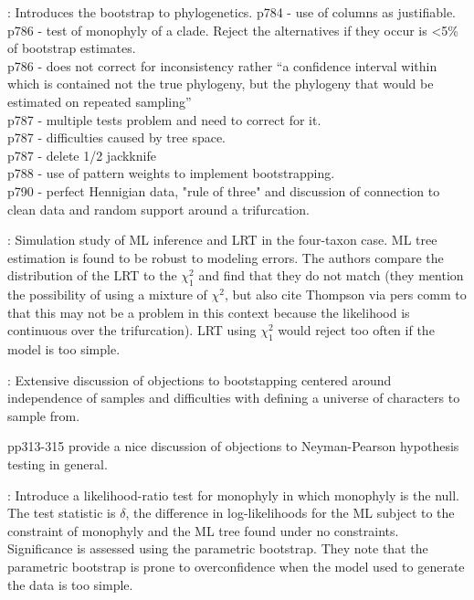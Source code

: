 \documentclass[11pt]{article}
\begin{document}
\citet{Felsenstein1985}: Introduces the bootstrap to phylogenetics.
p784 - use of columns as justifiable.\\
p786 - test of monophyly of a clade.  Reject the alternatives if they occur is <5\% of bootstrap estimates.\\
p786 - does not correct for inconsistency rather ``a confidence interval within which is contained not the true phylogeny, but the phylogeny that would be estimated on repeated sampling''\\
p787 - multiple tests problem and need to correct for it.\\
p787 - difficulties caused by tree space. \\
p787 - delete 1/2 jackknife \\
p788 - use of pattern weights to implement bootstrapping. \\
p790 - perfect Hennigian data, "rule of three" and discussion of connection to clean data and random support around a trifurcation.

\citet{GautL1995}: Simulation study of ML inference and LRT in the four-taxon case.  ML tree estimation is found to be robust to modeling errors. The authors compare the distribution of the LRT to the $\chi_1^2$ and find that they do not match (they mention the possibility of using a mixture of $\chi^2$, but also cite Thompson via pers comm to \citep{Felsenstein1988} that this may not be a problem in this context because the likelihood is continuous over the trifurcation).
LRT using $\chi_1^2$ would reject too often if the model is too simple.


\citet{Sanderson1995}: Extensive discussion of objections to bootstapping centered around independence of samples and difficulties with defining a universe of characters to sample from.
        
pp313-315 provide a nice discussion of objections to Neyman-Pearson hypothesis testing in general.      

\citet{HuelsenbeckHN1996}: Introduce a likelihood-ratio test for monophyly in which monophyly is the null.  The test statistic is $\delta$, the difference in log-likelihoods for the ML subject to the constraint of monophyly and the ML tree found under no constraints. 
Significance is assessed using the parametric bootstrap.
They note that the parametric bootstrap is prone to overconfidence when the model used to generate the data is too simple.
\end{document}
